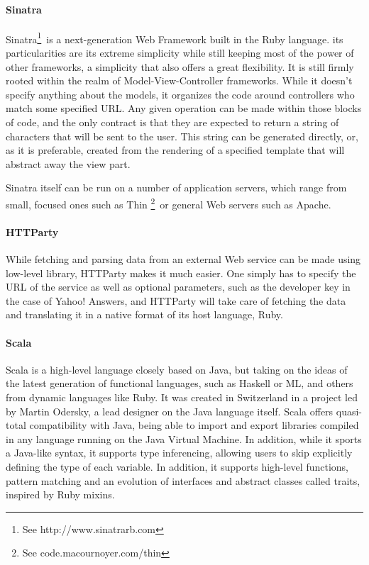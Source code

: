 
\paragraph{Sinatra} %
\label{par:sinatra}

Sinatra\footnote{See http://www.sinatrarb.com}\ is a next-generation Web Framework built in the Ruby language. its particularities are its extreme simplicity while still keeping most of the power of other frameworks, a simplicity that also offers a great flexibility. It is still firmly rooted within the realm of Model-View-Controller frameworks. While it doesn't specify anything about the models, it organizes the code around controllers who match some specified URL. Any given operation can be made within those blocks of code, and the only contract is that they are expected to return a string of characters that will be sent to the user. This string can be generated directly, or, as it is preferable, created from the rendering of a specified template that will abstract away the view part.

Sinatra itself can be run on a number of application servers, which range from small, focused ones such as Thin \footnote{See code.macournoyer.com/thin}\ or general Web servers such as Apache.


\paragraph{HTTParty} %
\label{par:httparty}

While fetching and parsing data from an external Web service can be made using low-level library, HTTParty makes it much easier. One simply has to specify the URL of the service as well as optional parameters, such as the developer key in the case of Yahoo! Answers, and HTTParty will take care of fetching the data and translating it in a native format of its host language, Ruby.


\paragraph{Scala} %
\label{par:scala}

Scala is a high-level language closely based on Java, but taking on the ideas of the latest generation of functional languages, such as Haskell or ML, and others from dynamic languages like Ruby. It was created in Switzerland in a project led by Martin Odersky, a lead designer on the Java language itself. Scala offers quasi-total compatibility with Java, being able to import and export libraries compiled in any language running on the Java Virtual Machine. In addition, while it sports a Java-like syntax, it supports type inferencing, allowing users to skip explicitly defining the type of each variable. In addition, it supports high-level functions, pattern matching and an evolution of interfaces and abstract classes called traits, inspired by Ruby mixins.

